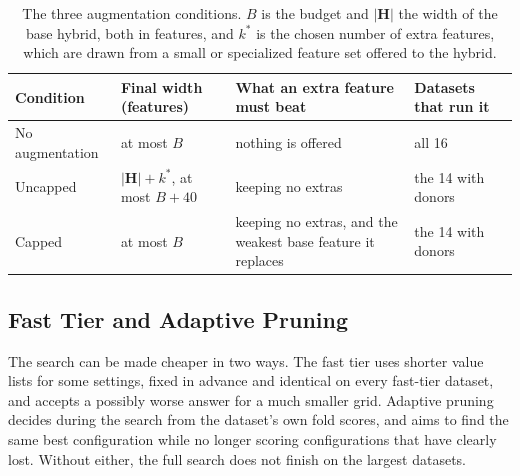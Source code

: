 \begin{table}[htbp]
\centering
\small
\begin{adjustbox}{max width=\textwidth,max totalheight=0.78\textheight}
\begin{tabular}{@{}P{2.4cm}P{3.0cm}P{4.6cm}P{3.6cm}@{}}
\toprule
Condition & Final width (features) & What an extra feature must beat & Datasets that run it \\
\midrule
No augmentation & at most $B$ & nothing is offered & all 16 \\
Uncapped & $|\mathbf{H}| + k^*$, at most $B + 40$ & keeping no extras & the 14 with donors \\
Capped & at most $B$ & keeping no extras, and the weakest base feature it replaces & the 14 with donors \\
\bottomrule
\end{tabular}
\end{adjustbox}
\caption[The three augmentation conditions.]{The three augmentation conditions. $B$ is the budget and $|\mathbf{H}|$ the width of the base hybrid, both in features, and $k^*$ is the chosen number of extra features, which are drawn from a small or specialized feature set offered to the hybrid.}
\label{tab:aug_conditions}
\end{table}


\subsection{Fast Tier and Adaptive Pruning}

The search can be made cheaper in two ways. The fast tier uses shorter value lists for some settings, fixed in advance and identical on every fast-tier dataset, and accepts a possibly worse answer for a much smaller grid. Adaptive pruning decides during the search from the dataset's own fold scores, and aims to find the same best configuration while no longer scoring configurations that have clearly lost. Without either, the full search does not finish on the largest datasets.

